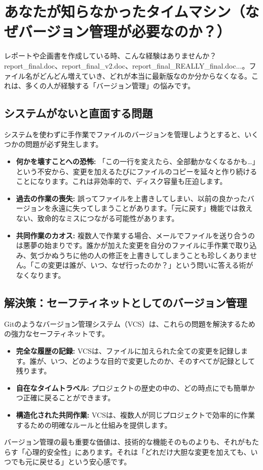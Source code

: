 \documentclass{ltjsarticle}
\begin{document}
\section{あなたが知らなかったタイムマシン（なぜバージョン管理が必要なのか？）}
レポートや企画書を作成している時、こんな経験はありませんか？ report_final.doc、report_final_v2.doc、report_final_REALLY_final.doc...。ファイル名がどんどん増えていき、どれが本当に最新版なのか分からなくなる。これは、多くの人が経験する「バージョン管理」の悩みです。

\subsection{システムがないと直面する問題}
システムを使わずに手作業でファイルのバージョンを管理しようとすると、いくつかの問題が必ず発生します。
\begin{itemize}
    \item \textbf{何かを壊すことへの恐怖:} 「この一行を変えたら、全部動かなくなるかも…」という不安から、変更を加えるたびにファイルのコピーを延々と作り続けることになります。これは非効率的で、ディスク容量も圧迫します。
    \item \textbf{過去の作業の喪失:} 誤ってファイルを上書きしてしまい、以前の良かったバージョンを永遠に失ってしまうことがあります。「元に戻す」機能では救えない、致命的なミスにつながる可能性があります。
    \item \textbf{共同作業のカオス:} 複数人で作業する場合、メールでファイルを送り合うのは悪夢の始まりです。誰かが加えた変更を自分のファイルに手作業で取り込み、気づかぬうちに他の人の修正を上書きしてしまうことも珍しくありません。「この変更は誰が、いつ、なぜ行ったのか？」という問いに答える術がなくなります。
\end{itemize}

\subsection{解決策：セーフティネットとしてのバージョン管理}
Gitのようなバージョン管理システム（VCS）は、これらの問題を解決するための強力なセーフティネットです。
\begin{itemize}
    \item \textbf{完全な履歴の記録:} VCSは、ファイルに加えられた全ての変更を記録します。誰が、いつ、どのような目的で変更したのか、そのすべてが記録として残ります。
    \item \textbf{自在なタイムトラベル:} プロジェクトの歴史の中の、どの時点にでも簡単かつ正確に戻ることができます。
    \item \textbf{構造化された共同作業:} VCSは、複数人が同じプロジェクトで効率的に作業するための明確なルールと仕組みを提供します。
\end{itemize}
バージョン管理の最も重要な価値は、技術的な機能そのものよりも、それがもたらす「心理的安全性」にあります。それは「どれだけ大胆な変更を加えても、いつでも元に戻せる」という安心感です。
\end{document}
